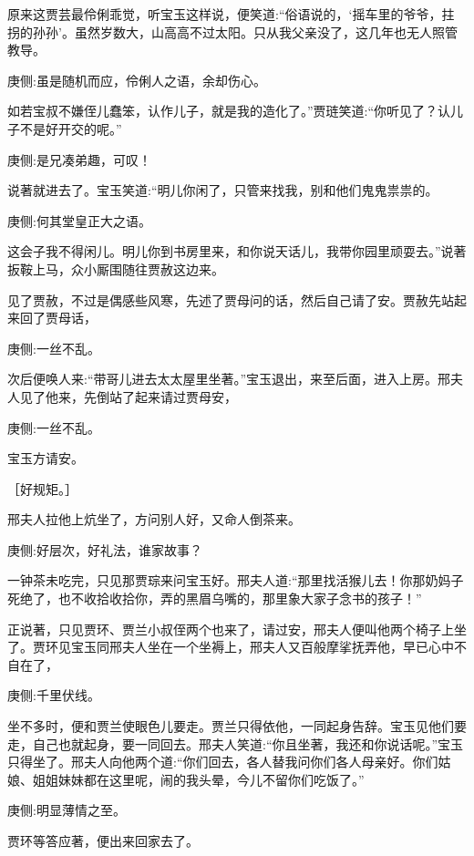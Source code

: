 \begin{parag}
    原来这贾芸最伶俐乖觉，听宝玉这样说，便笑道:“俗语说的，‘摇车里的爷爷，拄拐的孙孙’。虽然岁数大，山高高不过太阳。只从我父亲没了，这几年也无人照管教导。\begin{note}庚侧:虽是随机而应，伶俐人之语，余却伤心。\end{note}如若宝叔不嫌侄儿蠢笨，认作儿子，就是我的造化了。”贾琏笑道:“你听见了？认儿子不是好开交的呢。”\begin{note}庚侧:是兄凑弟趣，可叹！\end{note}说著就进去了。宝玉笑道:“明儿你闲了，只管来找我，别和他们鬼鬼祟祟的。\begin{note}庚侧:何其堂皇正大之语。\end{note}这会子我不得闲儿。明儿你到书房里来，和你说天话儿，我带你园里顽耍去。”说著扳鞍上马，众小厮围随往贾赦这边来。
\end{parag}


\begin{parag}
    见了贾赦，不过是偶感些风寒，先述了贾母问的话，然后自己请了安。贾赦先站起来回了贾母话，\begin{note}庚侧:一丝不乱。\end{note}次后便唤人来:“带哥儿进去太太屋里坐著。”宝玉退出，来至后面，进入上房。邢夫人见了他来，先倒站了起来请过贾母安，\begin{note}庚侧:一丝不乱。\end{note}宝玉方请安。\begin{note}［好规矩。］\end{note}邢夫人拉他上炕坐了，方问别人好，又命人倒茶来。\begin{note}庚侧:好层次，好礼法，谁家故事？\end{note}一钟茶未吃完，只见那贾琮来问宝玉好。邢夫人道:“那里找活猴儿去！你那奶妈子死绝了，也不收拾收拾你，弄的黑眉乌嘴的，那里象大家子念书的孩子！”
\end{parag}


\begin{parag}
    正说著，只见贾环、贾兰小叔侄两个也来了，请过安，邢夫人便叫他两个椅子上坐了。贾环见宝玉同邢夫人坐在一个坐褥上，邢夫人又百般摩挲抚弄他，早已心中不自在了，\begin{note}庚侧:千里伏线。\end{note}坐不多时，便和贾兰使眼色儿要走。贾兰只得依他，一同起身告辞。宝玉见他们要走，自己也就起身，要一同回去。邢夫人笑道:“你且坐著，我还和你说话呢。”宝玉只得坐了。邢夫人向他两个道:“你们回去，各人替我问你们各人母亲好。你们姑娘、姐姐妹妹都在这里呢，闹的我头晕，今儿不留你们吃饭了。”\begin{note}庚侧:明显薄情之至。\end{note}贾环等答应著，便出来回家去了。
\end{parag}


